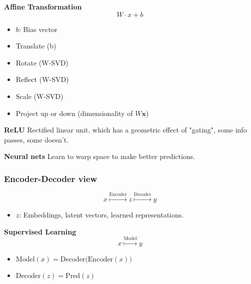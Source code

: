 \documentclass{article}
\begin{document}
\begin{notes} \textbf{Affine Transformation}
    \begin{equation}
        W \cdot x + b
    \end{equation}
    \begin{itemize}
        \item $b$: Bias vector
    \end{itemize}
    \vspace{1em}

    \begin{itemize}
        \item Translate (b)
        \item Rotate (W-SVD)
        \item Reflect (W-SVD)
        \item Scale (W-SVD)
        \item Project up or down (dimensionality of $W \mathbf{x}$)
    \end{itemize}
\end{notes}

\begin{notes} \textbf{ReLU} Rectified linear unit, which has a geometric effect of "gating", some info passes, some doesn't.
\end{notes}

\begin{notes} \textbf{Neural nets} Learn to warp space to make better predictions.
\end{notes}

\subsubsection{Encoder-Decoder view}
\begin{definition}
    \begin{equation}
        x \overset{\text{Encoder}}{\mapsto} z \overset{\text{Decoder}}{\mapsto} y
    \end{equation}
    \begin{itemize}
        \item $z$: Embeddings, latent vectors, learned representations.
    \end{itemize}
\end{definition}

\begin{example} \textbf{Supervised Learning}
    \begin{equation}
        x \overset{\text{Model}}{\mapsto} y
    \end{equation}
    \begin{itemize}
        \item $\mathrm{Model}(x) = \mathrm{Decoder}\bigl(\mathrm{Encoder}(x)\bigr)$
        \item $\mathrm{Decoder}(z) = \mathrm{Pred}(z)$
    \end{itemize}
    
\end{example}
\end{document}

